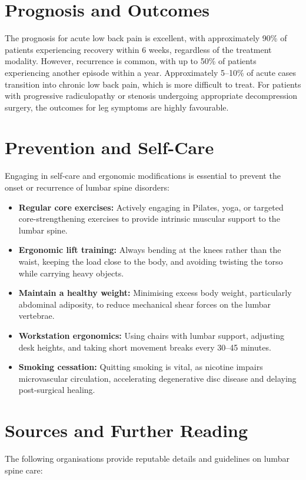 \section*{Prognosis and Outcomes}
The prognosis for acute low back pain is excellent, with approximately 90\% of patients experiencing recovery within 6 weeks, regardless of the treatment modality. However, recurrence is common, with up to 50\% of patients experiencing another episode within a year. Approximately 5--10\% of acute cases transition into chronic low back pain, which is more difficult to treat. For patients with progressive radiculopathy or stenosis undergoing appropriate decompression surgery, the outcomes for leg symptoms are highly favourable.

\section*{Prevention and Self-Care}
Engaging in self-care and ergonomic modifications is essential to prevent the onset or recurrence of lumbar spine disorders:

\begin{itemize}
    \item \textbf{Regular core exercises:} Actively engaging in Pilates, yoga, or targeted core-strengthening exercises to provide intrinsic muscular support to the lumbar spine.
    \item \textbf{Ergonomic lift training:} Always bending at the knees rather than the waist, keeping the load close to the body, and avoiding twisting the torso while carrying heavy objects.
    \item \textbf{Maintain a healthy weight:} Minimising excess body weight, particularly abdominal adiposity, to reduce mechanical shear forces on the lumbar vertebrae.
    \item \textbf{Workstation ergonomics:} Using chairs with lumbar support, adjusting desk heights, and taking short movement breaks every 30--45 minutes.
    \item \textbf{Smoking cessation:} Quitting smoking is vital, as nicotine impairs microvascular circulation, accelerating degenerative disc disease and delaying post-surgical healing.
\end{itemize}

\section*{Sources and Further Reading}
The following organisations provide reputable details and guidelines on lumbar spine care:

